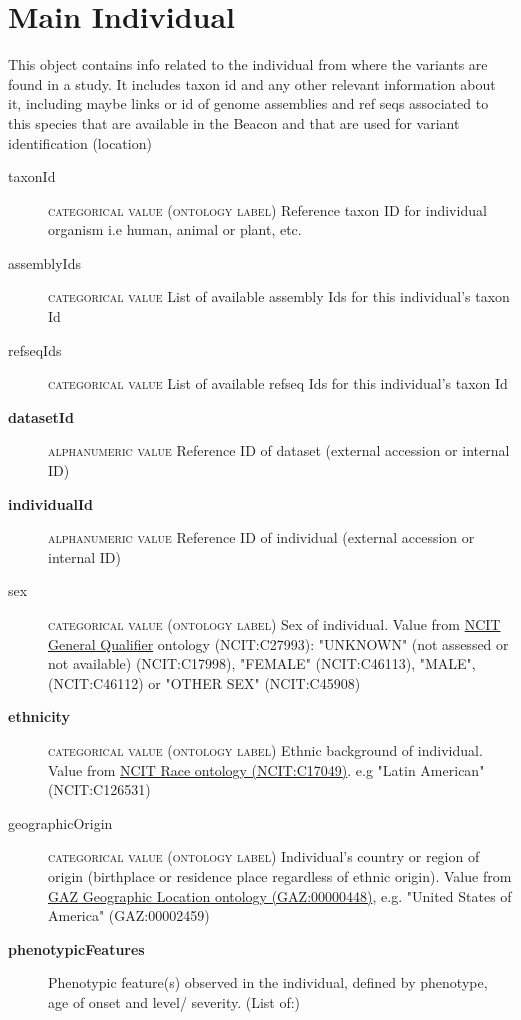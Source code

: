 \documentclass[a4paper, 10pt]{article}        %
\begin{document}
 
 
\section*{{\color{teal} Main Individual}}
This object contains info related to the individual from where the variants are found in a study. It includes taxon id and any other relevant information about it, including maybe links or id of genome assemblies and ref seqs associated to this species that are available in the Beacon and that are used for variant identification (location)
\begin{description}
	\item[taxonId] {\textsc{categorical value (ontology label)}} Reference taxon ID for individual organism i.e human, animal or plant, etc.
	\item[assemblyIds]{\textsc{categorical value}} List of available assembly Ids for this individual's taxon Id
	\item[refseqIds]{\textsc{categorical value}} List of available refseq Ids for this individual's taxon Id
	\item[\textbf{datasetId}] {\textsc{alphanumeric value}} Reference ID of dataset (external accession or internal ID)
	\item[\textbf{individualId}]  {\textsc{alphanumeric value}} Reference ID of individual (external accession or internal ID)
	\item[sex] {\textsc{categorical value (ontology label)}} Sex of individual. Value from \href{link}{NCIT General Qualifier} ontology (NCIT:C27993): "UNKNOWN" (not assessed or not available) (NCIT:C17998), "FEMALE" (NCIT:C46113), "MALE", (NCIT:C46112) or "OTHER SEX" (NCIT:C45908)
	\item[\textbf{ethnicity}] {\textsc{categorical value (ontology label)}} Ethnic background of individual. Value from \href{link}{NCIT Race ontology (NCIT:C17049)}. e.g "Latin American" (NCIT:C126531)
	\item[geographicOrigin] {\textsc{categorical value (ontology label)}} Individual's country or region of origin (birthplace or residence place regardless of ethnic origin). Value from \href{link}{GAZ Geographic Location ontology (GAZ:00000448)}, e.g. "United States of America" (GAZ:00002459)
	\item[\textbf{phenotypicFeatures}] Phenotypic feature(s) observed in the individual, defined by phenotype, age of onset and level/ severity. (List of:)

\end{description}
\end{document}
